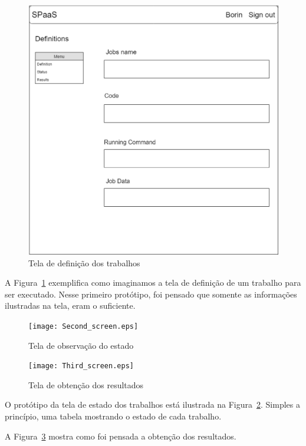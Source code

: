 \documentclass[11pt,twoside]{article}
\begin{document}
\begin{figure}[!h]
  \centering
  \includegraphics[scale=0.2]{First_screen.eps}
  \caption{Tela de definição dos trabalhos}
  \label{fig:definitionScreen}
\end{figure}

A Figura~\ref{fig:definitionScreen} exemplifica como imaginamos a tela de definição de um trabalho para ser executado. Nesse primeiro protótipo, foi pensado que somente 
as informações ilustradas na tela, eram o suficiente.

\begin{figure}[!h]
  \centering
  \texttt{[image: Second\_screen.eps]}
  \caption{Tela de observação do estado}
  \label{fig:statusScreen}
\end{figure}

\begin{figure}[!h]
  \centering
  \texttt{[image: Third\_screen.eps]}
  \caption{Tela de obtenção dos resultados}
  \label{fig:resultsScreen}
\end{figure}

O protótipo da tela de estado dos trabalhos está ilustrada na Figura~\ref{fig:statusScreen}. Simples a princípio, uma tabela mostrando o estado de cada trabalho. 

A Figura~\ref{fig:resultsScreen} mostra como foi pensada a obtenção dos resultados.
\end{document}
